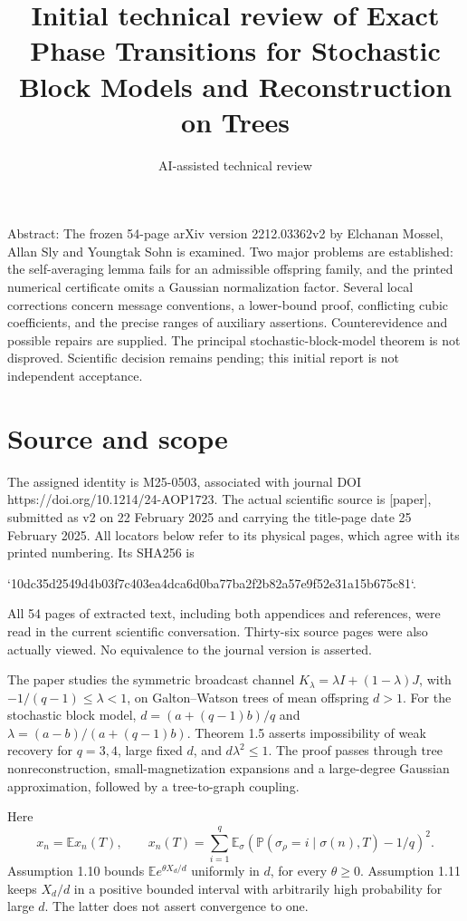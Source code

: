 \documentclass[10pt]{article}
\title{Initial technical review of
Exact Phase Transitions for Stochastic Block Models and Reconstruction on Trees}
\author{AI-assisted technical review}
\date{}
\begin{document}
\maketitle
Abstract: The frozen 54-page arXiv version 2212.03362v2 by Elchanan Mossel, Allan Sly and Youngtak Sohn is examined. Two major problems are established: the self-averaging lemma fails for an admissible offspring family, and the printed numerical certificate omits a Gaussian normalization factor. Several local corrections concern message conventions, a lower-bound proof, conflicting cubic coefficients, and the precise ranges of auxiliary assertions. Counterevidence and possible repairs are supplied. The principal stochastic-block-model theorem is not disproved. Scientific decision remains pending; this initial report is not independent acceptance.\par
\section*{Source and scope}
The assigned identity is M25-0503, associated with journal DOI https://doi.org/10.1214/24-AOP1723. The actual scientific source is [paper], submitted as v2 on 22 February 2025 and carrying the title-page date 25 February 2025. All locators below refer to its physical pages, which agree with its printed numbering. Its SHA256 is\par
`10dc35d2549d4b03f7c403ea4dca6d0ba77ba2f2b82a57e9f52e31a15b675c81`.\par
All 54 pages of extracted text, including both appendices and references, were read in the current scientific conversation. Thirty-six source pages were also actually viewed. No equivalence to the journal version is asserted.\par
The paper studies the symmetric broadcast channel \(K_\lambda=\lambda I+(1-\lambda)J\), with \(-1/(q-1)\leq\lambda<1\), on Galton–Watson trees of mean offspring \(d>1\). For the stochastic block model, \(d=(a+(q-1)b)/q\) and \(\lambda=(a-b)/(a+(q-1)b)\). Theorem 1.5 asserts impossibility of weak recovery for \(q=3,4\), large fixed \(d\), and \(d\lambda^2\leq1\). The proof passes through tree nonreconstruction, small-magnetization expansions and a large-degree Gaussian approximation, followed by a tree-to-graph coupling.\par
Here \[x_n=\mathbb Ex_n(T),\qquad
 x_n(T)=\sum_{i=1}^q\mathbb E_\sigma
       \left(\mathbb P(\sigma_\rho=i\mid \sigma(n),T)-1/q\right)^2.\] Assumption 1.10 bounds \(\mathbb Ee^{\theta X_d/d}\) uniformly in \(d\), for every \(\theta\geq0\). Assumption 1.11 keeps \(X_d/d\) in a positive bounded interval with arbitrarily high probability for large \(d\). The latter does not assert convergence to one.\par
\end{document}
